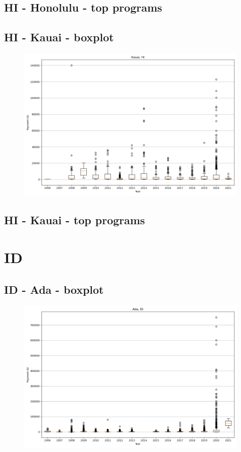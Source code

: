 \subsection*{HI - Honolulu - top programs}

\newpage
\subsection*{HI - Kauai - boxplot}
\begin{figure}[h]
\centering
\includegraphics[width=7in]{../output/boxplots/counties/Kauai-HI_boxplot.png}
\end{figure}


\subsection*{HI - Kauai - top programs}

\newpage
\section*{ID}
\subsection*{ID - Ada - boxplot}
\begin{figure}[h]
\centering
\includegraphics[width=7in]{../output/boxplots/counties/Ada-ID_boxplot.png}
\end{figure}


